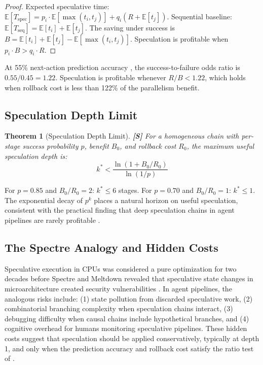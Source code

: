 \documentclass[11pt, a4paper, logo, copyright]{googledeepmind}
\newtheorem{theorem}{Theorem}[section]
\newcommand{\E}{\mathbb{E}}
\begin{document}
\begin{proof}
Expected speculative time: $\E[T_{\mathrm{spec}}] = p_i \cdot \E[\max(t_i, t_j)] + q_i(R + \E[t_j])$. Sequential baseline: $\E[T_{\mathrm{seq}}] = \E[t_i] + \E[t_j]$. The saving under success is $B = \E[t_i] + \E[t_j] - \E[\max(t_i, t_j)]$. Speculation is profitable when $p_i \cdot B > q_i \cdot R$.
\end{proof}

At 55\% next-action prediction accuracy \citep{zhou2025speculative}, the success-to-failure odds ratio is $0.55/0.45 = 1.22$. Speculation is profitable whenever $R/B < 1.22$, which holds when rollback cost is less than 122\% of the parallelism benefit.

\subsection{Speculation Depth Limit}

\begin{theorem}[Speculation Depth Limit]\label{thm:depth}
\textbf{[S]} For a homogeneous chain with per-stage success probability $p$, benefit $B_0$, and rollback cost $R_0$, the maximum useful speculation depth is:
\[
    k^* < \frac{\ln(1 + B_0/R_0)}{\ln(1/p)}
\]
\end{theorem}

For $p = 0.85$ and $B_0/R_0 = 2$: $k^* \leq 6$ stages. For $p = 0.70$ and $B_0/R_0 = 1$: $k^* \leq 1$. The exponential decay of $p^k$ places a natural horizon on useful speculation, consistent with the practical finding that deep speculation chains in agent pipelines are rarely profitable \citep{zhou2025speculative}.

\subsection{The Spectre Analogy and Hidden Costs}

Speculative execution in CPUs was considered a pure optimization for two decades before Spectre and Meltdown revealed that speculative state changes in microarchitecture created security vulnerabilities \citep{spectre2018}. In agent pipelines, the analogous risks include: (1) state pollution from discarded speculative work, (2) combinatorial branching complexity when speculation chains interact, (3) debugging difficulty when causal chains include hypothetical branches, and (4) cognitive overhead for humans monitoring speculative pipelines. These hidden costs suggest that speculation should be applied conservatively, typically at depth 1, and only when the prediction accuracy and rollback cost satisfy the ratio test of .
\end{document}
